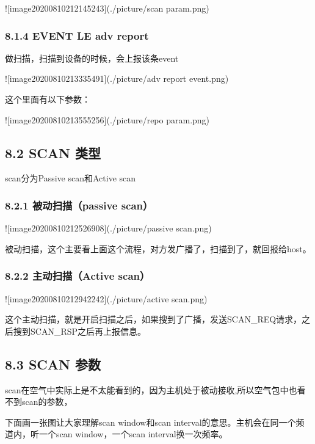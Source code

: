 \documentclass[letterpaper,10pt,english]{sphinxmanual}
\begin{document}
!{[}image\sphinxhyphen{}20200810212145243{]}(./picture/scan param.png)


\subsubsection{8.1.4 EVENT  LE adv report}
\label{\detokenize{test/ble_adv_scan_all:event-le-adv-report}}
做扫描，扫描到设备的时候，会上报该条event

!{[}image\sphinxhyphen{}20200810213335491{]}(./picture/adv report event.png)

这个里面有以下参数：

!{[}image\sphinxhyphen{}20200810213555256{]}(./picture/repo param.png)


\subsection{8.2  SCAN 类型}
\label{\detokenize{test/ble_adv_scan_all:id7}}
scan分为Passive scan和Active scan


\subsubsection{8.2.1 被动扫描（passive scan）}
\label{\detokenize{test/ble_adv_scan_all:passive-scan}}
!{[}image\sphinxhyphen{}20200810212526908{]}(./picture/passive scan.png)

被动扫描，这个主要看上面这个流程，对方发广播了，扫描到了，就回报给host。


\subsubsection{8.2.2 主动扫描（Active scan）}
\label{\detokenize{test/ble_adv_scan_all:active-scan}}
!{[}image\sphinxhyphen{}20200810212942242{]}(./picture/active scan.png)

这个主动扫描，就是开启扫描之后，如果搜到了广播，发送SCAN\_REQ请求，之后搜到SCAN\_RSP之后再上报信息。


\subsection{8.3 SCAN 参数}
\label{\detokenize{test/ble_adv_scan_all:id8}}
scan在空气中实际上是不太能看到的，因为主机处于被动接收,所以空气包中也看不到scan的参数，

下面画一张图让大家理解scan window和scan interval的意思。主机会在同一个频道内，听一个scan window，一个scan interval换一次频率。
\end{document}
